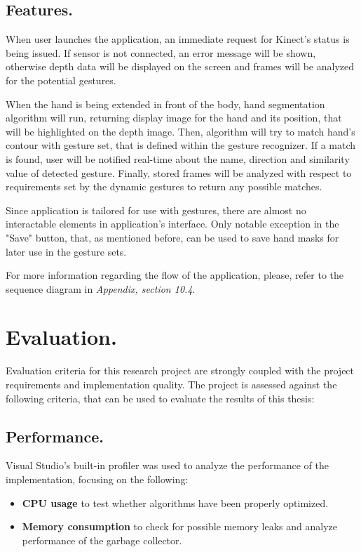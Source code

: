 \documentclass[a4paper,11pt,oneside]{article}
\begin{document}
\subsection{Features.}

When user launches the application, an immediate request for Kinect's status is being issued. If sensor is not connected, an error message will be shown, otherwise depth data will be displayed on the screen and frames will be analyzed for the potential gestures. 

When the hand is being extended in front of the body, hand segmentation algorithm will run, returning display image for the hand and its position, that will be highlighted on the depth image. Then, algorithm will try to match hand's contour with gesture set, that is defined within the gesture recognizer. If a match is found, user will be notified real-time about the name, direction and similarity value of detected gesture. Finally, stored frames will be analyzed with respect to requirements set by the dynamic gestures to return any possible matches.

Since application is tailored for use with gestures, there are almost no interactable elements in application's interface. Only notable exception in the "Save" button, that, as mentioned before, can be used to save hand masks for later use in the gesture sets.

For more information regarding the flow of the application, please, refer to the sequence diagram in \textit{Appendix, section 10.4}.

\section{Evaluation.}

Evaluation criteria for this research project are strongly coupled with the project requirements and implementation quality. The project is assessed against the following criteria, that can be used to evaluate the results of this thesis:

\subsection{Performance.}

Visual Studio's built-in profiler was used to analyze the performance of the implementation, focusing on the following:

\begin{itemize}
\item \textbf{CPU usage} to test whether algorithms have been properly optimized.
\item \textbf{Memory consumption} to check for possible memory leaks and analyze performance of the garbage collector.
\end{itemize}
\end{document}
